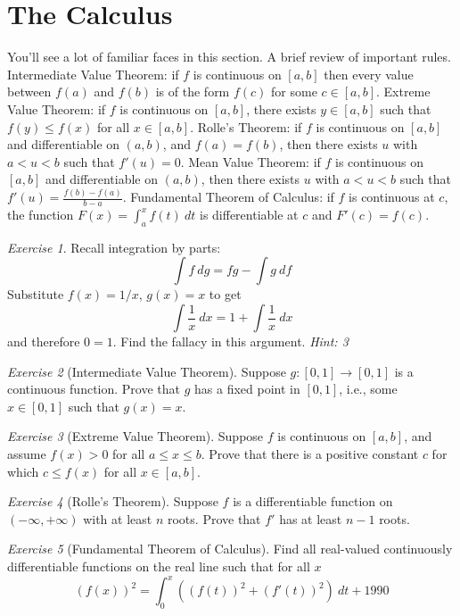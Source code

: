 \documentclass{article}
\theoremstyle{definition}
\theoremstyle{remark}
\newtheorem{exercise}{Exercise}
\begin{document}
\section{The Calculus}
You'll see a lot of familiar faces in this section. A brief review of important rules. Intermediate Value Theorem: if $f$ is continuous on $[a,b]$ then every value between $f(a)$ and $f(b)$ is of the form $f(c) $ for some $c\in [a,b]$. Extreme Value Theorem: if $f$ is continuous on $[a,b]$, there exists $y\in [a,b]$ such that $f(y)\leq f(x)$ for all $x\in [a,b]$. Rolle's Theorem: if $f$ is continuous on $[a,b]$ and differentiable on $(a,b)$, and $f(a)=f(b)$, then there exists $u$ with $a < u < b$ such that $f'(u)=0$. Mean Value Theorem: if $f$ is continuous on $[a,b]$ and differentiable on $(a,b)$, then there exists $u$ with $a < u < b$ such that $f'(u)=\frac{f(b)-f(a)}{b-a}$. Fundamental Theorem of Calculus: if $f$ is continuous at $c$, the function $F(x) = \int_a^x f(t)\ dt$ is differentiable at $c$ and $F'(c)=f(c)$.

\begin{exercise}
Recall integration by parts:
\[ \int f\ dg = fg- \int g\ df\] Substitute $f(x)=1/x$, $g(x)=x$ to get
\[\int \frac{1}{x}\ dx = 1+ \int \frac{1}{x}\ dx\] and therefore $0=1$. Find the fallacy in this argument. \emph{Hint: 3}
\end{exercise}

\begin{exercise}[Intermediate Value Theorem]
Suppose $g:[0,1]\to [0,1]$ is a continuous function. Prove that $g$ has a fixed point in $[0,1]$, i.e., some $x\in [0,1]$ such that $g(x)=x$.
\end{exercise}

\begin{exercise}[Extreme Value Theorem]
Suppose $f$ is continuous on $[a,b]$, and assume $f(x)>0$ for all $a\leq x \leq b$. Prove that there is a positive constant $c$ for which $c\leq f(x)$ for all $x\in [a,b]$.
\end{exercise}

\begin{exercise}[Rolle's Theorem]
Suppose $f$ is a differentiable function on $(-\infty, +\infty)$ with at least $n$ roots. Prove that $f'$ has at least $n-1$ roots.
\end{exercise}

\begin{exercise}[Fundamental Theorem of Calculus]
Find all real-valued continuously differentiable functions on the real line such that for all $x$
\[(f(x))^2 = \int_0^x \left((f(t))^2 + (f'(t))^2\right)\ dt + 1990\]
\end{exercise}
\end{document}
